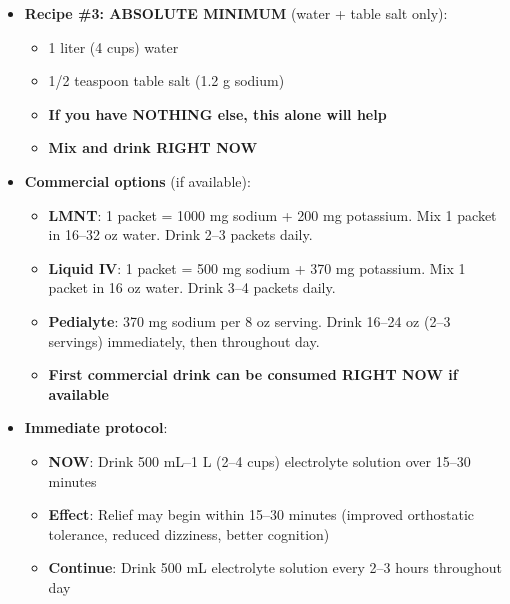 \begin{enumerate}
\begin{itemize}
        \item \textbf{Recipe \#3: ABSOLUTE MINIMUM} (water + table salt only):
        \begin{itemize}
            \item 1 liter (4 cups) water
            \item 1/2 teaspoon table salt (1.2 g sodium)
            \item \textbf{If you have NOTHING else, this alone will help}
            \item \textbf{Mix and drink RIGHT NOW}
        \end{itemize}

        \item \textbf{Commercial options} (if available):
        \begin{itemize}
            \item \textbf{LMNT}: 1 packet = 1000 mg sodium + 200 mg potassium. Mix 1 packet in 16--32 oz water. Drink 2--3 packets daily.
            \item \textbf{Liquid IV}: 1 packet = 500 mg sodium + 370 mg potassium. Mix 1 packet in 16 oz water. Drink 3--4 packets daily.
            \item \textbf{Pedialyte}: 370 mg sodium per 8 oz serving. Drink 16--24 oz (2--3 servings) immediately, then throughout day.
            \item \textbf{First commercial drink can be consumed RIGHT NOW if available}
        \end{itemize}

        \item \textbf{Immediate protocol}:
        \begin{itemize}
            \item \textbf{NOW}: Drink 500 mL--1 L (2--4 cups) electrolyte solution over 15--30 minutes
            \item \textbf{Effect}: Relief may begin within 15--30 minutes (improved orthostatic tolerance, reduced dizziness, better cognition)
            \item \textbf{Continue}: Drink 500 mL electrolyte solution every 2--3 hours throughout day
        \end{itemize}
    \end{itemize}


\end{enumerate}

